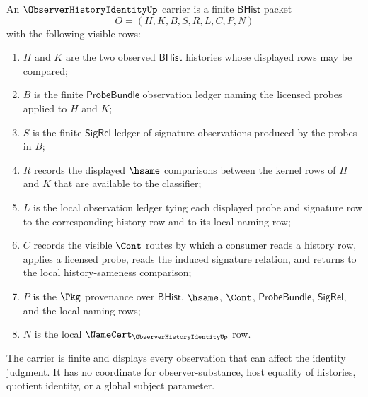 \begin{definition}
\label{def:observer-history-identity-carrier}
An $\ObserverHistoryIdentityUp$ carrier is a finite $\mathsf{BHist}$ packet
$$
O=(H,K,B,S,R,L,C,P,N)
$$
with the following visible rows:
\begin{enumerate}
\item $H$ and $K$ are the two observed $\mathsf{BHist}$ histories whose displayed rows may be compared;
\item $B$ is the finite $\mathsf{ProbeBundle}$ observation ledger naming the licensed probes applied to $H$ and $K$;
\item $S$ is the finite $\mathsf{SigRel}$ ledger of signature observations produced by the probes in $B$;
\item $R$ records the displayed $\hsame$ comparisons between the kernel rows of $H$ and $K$ that are available to the classifier;
\item $L$ is the local observation ledger tying each displayed probe and signature row to the corresponding history row and to its local naming row;
\item $C$ records the visible $\Cont$ routes by which a consumer reads a history row, applies a licensed probe, reads the induced signature relation, and returns to the local history-sameness comparison;
\item $P$ is the $\Pkg$ provenance over $\mathsf{BHist}$, $\hsame$, $\Cont$, $\mathsf{ProbeBundle}$, $\mathsf{SigRel}$, and the local naming rows;
\item $N$ is the local $\NameCert_{\ObserverHistoryIdentityUp}$ row.
\end{enumerate}
The carrier is finite and displays every observation that can affect the identity judgment. It has no coordinate for observer-substance, host equality of histories, quotient identity, or a global subject parameter.
\end{definition}


